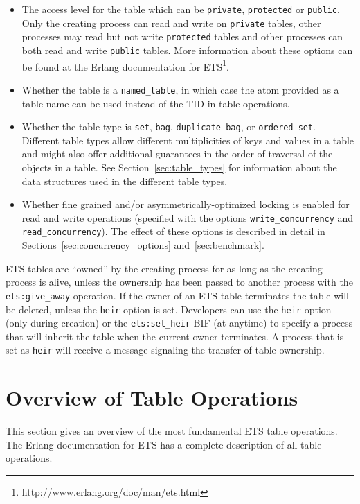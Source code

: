 \documentclass[aps,pre,preprint,nofootinbib]{revtex4}
\begin{document}
\begin{itemize}
\item
  The access level for the table which can be \verb|private|, \verb|protected| or \verb|public|.
  Only the creating process can read and write on \verb|private| tables, other processes may read but not write \verb|protected| tables and other processes can both read and write \verb|public| tables.
  More information about these options can be found at the Erlang documentation for ETS\footnote{http://www.erlang.org/doc/man/ets.html}.
\item
  Whether the table is a \verb|named_table|, in which case the atom provided as a table name can be used instead of the TID in table operations.
\item
  Whether the table type is \verb|set|, \verb|bag|, \verb|duplicate_bag|, or \verb|ordered_set|.
  Different table types allow different multiplicities of keys and values in a table and might also offer additional guarantees in the order of traversal of the objects in a table.
  See Section~\ref{sec:table_types} for information about the data structures used in the different table types.
\item
  Whether fine grained and/or asymmetrically-optimized locking is enabled for read and write operations (specified with the options \verb|write_concurrency| and \verb|read_concurrency|).
  The effect of these options is described in detail in Sections~\ref{sec:concurrency_options} and~\ref{sec:benchmark}.
\end{itemize}

ETS tables are ``owned'' by the creating process for as long as the creating process is alive, unless the ownership has been passed to another process with the \verb|ets:give_away| operation.
If the owner of an ETS table terminates the table will be deleted, unless the \verb|heir| option is set.
Developers can use the \verb|heir| option (only during creation) or the \verb|ets:set_heir| BIF (at anytime) to specify a process that will inherit the table when the current owner terminates.
A process that is set as \verb|heir| will receive a message signaling the transfer of table ownership.

\section{Overview of Table Operations}

This section gives an overview of the most fundamental ETS table operations.
The Erlang documentation for ETS has a complete description of all table operations.
\end{document}
